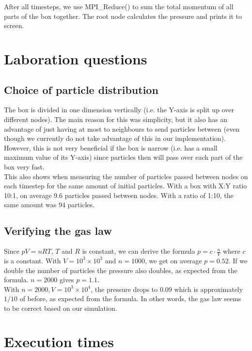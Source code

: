\documentclass[a4paper]{article}
\begin{document}
After all timesteps, we use MPI\_Reduce() to sum the total momentum of
all parts of the box together. The root node calculates the pressure and
prints it to screen.

\section{Laboration questions}

\subsection{Choice of particle distribution} The box is divided in one
dimension vertically (i.e. the Y-axis is split up over different nodes).
The main reason for this was simplicity, but it also has an advantage of
just having at most to neighbours to send particles between (even
though we currently do not take advantage of this in our
implementation).\\

However, this is not very beneficial if the box is narrow (i.e. has a
small maximum value of its Y-axis) since particles then will pass over
each part of the box very fast.\\

This also shows when measuring the number of particles passed between
nodes on each timestep for the same amount of initial particles. With a
box with X:Y ratio 10:1, on average 9.6 particles passed between nodes.
With a ratio of 1:10, the same amount was 94 particles.


\subsection{Verifying the gas law}

Since $pV = nRT$, $T$ and $R$ is constant, we can derive the formula
$p=c\cdot\frac{n}{V}$ where $c$ is a constant. With $V=10^{3} \times
10^{3}$ and $n=1000$, we get on average $p=0.52$. If we double the
number of particles the pressure also doubles, as expected from the
formula. $n=2000$ gives $p=1.1$.\\

With $n=2000, V=10^{3} \times 10^{4}$, the pressure drops to 0.09 which
is approximately $1/10$ of before, as expected from the formula. In
other words, the gas law seems to be correct based on our simulation.

\section{Execution times}
\end{document}
